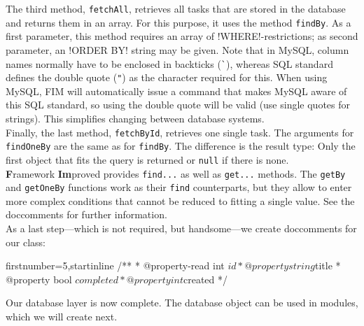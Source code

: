 \documentclass{scrartcl}
\newcommand{\fim}{\textbf{F}ramework \textbf{Im}proved}
\begin{document}
      The third method, \lstinline!fetchAll!, retrieves all tasks that are stored in the database and returns them in an array. For this purpose, it uses the method \lstinline!findBy!. As a first parameter, this method requires an array of \mysql!WHERE!-restrictions; as second parameter, an \mysql!ORDER BY! string may be given. Note that in MySQL, column names normally have to be enclosed in backticks (\verb!`!), whereas SQL standard defines the double quote (\verb!"!) as the character required for this. When using MySQL, FIM will automatically issue a command that makes MySQL aware of this SQL standard, so using the double quote will be valid (use single quotes for strings). This simplifies changing between database systems. \\
      Finally, the last method, \lstinline!fetchById!, retrieves one single task. The arguments for \lstinline!findOneBy! are the same as for \lstinline!findBy!. The difference is the result type: Only the first object that fits the query is returned or \lstinline!null! if there is none. \\
      \fim{} provides \lstinline!find...! as well as \lstinline!get...! methods. The \lstinline!getBy! and \lstinline!getOneBy! functions work as their \lstinline!find! counterparts, but they allow to enter more complex conditions that cannot be reduced to fitting a single value. See the doccomments for further information. \\
      As a last step---which is not required, but handsome---we create doccomments for our class:
      \begin{phpcode*}{firstnumber=5,startinline}
/**
 * @property-read int $id
 * @property string $title
 * @property bool $completed
 * @property int $created
 */
      \end{phpcode*}
      Our database layer is now complete. The database object can be used in modules, which we will create next.
\end{document}
